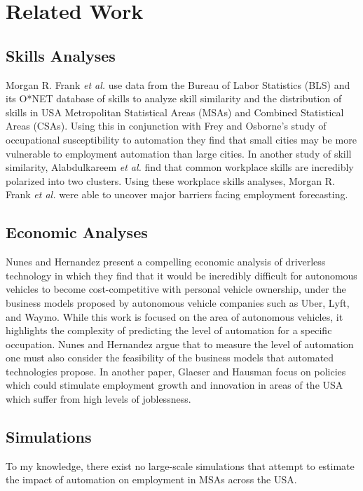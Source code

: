 \documentclass[10pt]{article}
\begin{document}
\section{Related Work}
\subsection{Skills Analyses}
Morgan R. Frank \textit{et al.} \cite{MorganSmallCities} use data from the Bureau of Labor Statistics (BLS) and its O*NET database of skills \cite{O*NET} to analyze skill similarity and the distribution of skills in USA Metropolitan Statistical Areas (MSAs) and Combined Statistical Areas (CSAs). Using this in conjunction with Frey and Osborne's study of occupational susceptibility to automation \cite{FreyOsborneAutomation} they find that small cities may be more vulnerable to employment automation than large cities. In another study of skill similarity, Alabdulkareem \textit{et al.} \cite{AlabdulkareemSkillPolarization} find that common workplace skills are incredibly polarized into two clusters. Using these workplace skills analyses, Morgan R. Frank \textit{et al.} \cite{MorganAIImpact} were able to uncover major barriers facing employment forecasting. 

\subsection{Economic Analyses}
Nunes and Hernandez \cite{NunesDriverlessTech} present a compelling economic analysis of driverless technology in which they find that it would be incredibly difficult for autonomous vehicles to become cost-competitive with personal vehicle ownership, under the business models proposed by autonomous vehicle companies such as Uber, Lyft, and Waymo. While this work is focused on the area of autonomous vehicles, it highlights the complexity of predicting the level of automation for a specific occupation. Nunes and Hernandez argue that to measure the level of automation one must also consider the feasibility of the business models that automated technologies propose. In another paper, Glaeser and Hausman \cite{GlaeserJoblessness} focus on policies which could stimulate employment growth and innovation in areas of the USA which suffer from high levels of joblessness.

\subsection{Simulations}
To my knowledge, there exist no large-scale simulations that attempt to estimate the impact of automation on employment in MSAs across the USA.
\end{document}
